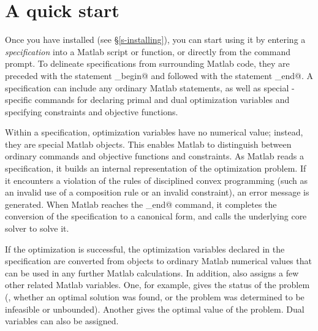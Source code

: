 \documentclass[12pt]{article}
\begin{document}


\newpage
\section{A quick start}
\label{sec:quickstart}

Once you have installed \cvx (see \S\ref{s-installing}), you can
start using it by entering a \cvx \emph{specification} into a
Matlab script or function, or directly from the command prompt.
To delineate \cvx specifications from surrounding Matlab code,
they are preceded with the statement
\verb@cvx_begin@ and followed with the statement
\verb@cvx_end@. A specification can
include any ordinary Matlab statements, as well as
special \cvx-specific commands for declaring primal and dual 
optimization variables and specifying constraints and
objective functions.

Within a \cvx specification, optimization variables have no numerical
value; instead, they are special Matlab objects.   
This enables Matlab to distinguish
between ordinary commands and \cvx objective
functions and constraints. As Matlab reads a \cvx specification,
it builds an internal representation of the
optimization problem. If it encounters a
violation of the rules of disciplined convex programming
(such as an invalid use of a composition rule or an invalid
constraint), an error message is generated.
When Matlab reaches 
the \verb@cvx_end@ command, it completes the conversion of
the \cvx specification to a canonical form,
and calls the underlying core solver to solve it.

If the optimization is successful,
the optimization variables declared in the \cvx specification
are converted from objects to ordinary Matlab numerical values
that can be used in any further Matlab calculations. In addition,
\cvx also assigns a few other related Matlab variables.
One, for example, gives the status of the problem (\ie, whether an
optimal solution was found, or the problem was determined to be 
infeasible or unbounded).  Another gives the optimal value
of the problem. Dual variables can also be assigned.
\end{document}
